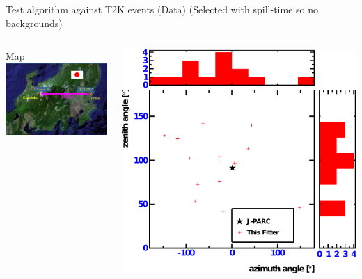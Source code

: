 \documentclass[14pt]{beamer}
\begin{document}
\begin{frame}{Test algorithm against T2K events (Data)}
	{\small(Selected with spill-time so no backgrounds)}
	\begin{columns}[T]
		\begin{block}{\centering\small{Map}}
			\vspace{10mm}
			\includegraphics[width=\linewidth]{t2k.jpeg}
		\end{block}
		\begin{block}{}
			\vspace{10mm}
			\includegraphics[width=\linewidth]{analyzed_rtq_t2k_nu_noNegativeCharge_prepulseCut_t2kReconDir.pdf}
		\end{block}
	\end{columns}
\end{frame}
\end{document}
